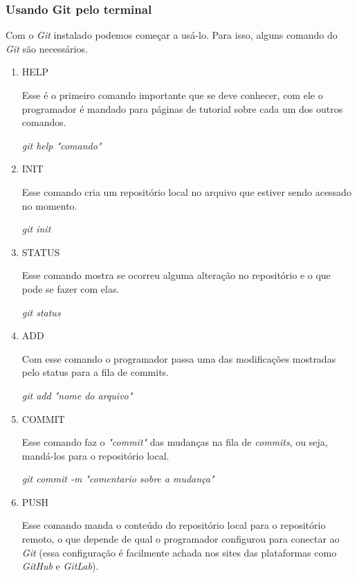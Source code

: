 \documentclass{article}
\begin{document}
\subsubsection{Usando Git pelo terminal}
\hspace{4mm}Com o \textit{Git} instalado podemos começar a usá-lo. Para isso, alguns comando do \textit{Git} são necessários.
\begin{enumerate}
    \item HELP
    
    \hspace{4mm}Esse é o primeiro comando importante que se deve conhecer, com ele o programador é mandado para páginas de tutorial sobre cada um dos outros comandos.
    
    \textit{git help "comando"}
    \item INIT
    
    \hspace{4MM}Esse comando cria um repositório local no arquivo que estiver sendo acessado no momento. 
    
    \textit{git init}
    \item STATUS
    
    \hspace{4mm}Esse comando mostra se ocorreu alguma alteração no repositório e o que pode se fazer com elas. 
    
    \textit{git status}
    \item ADD
    
    \hspace{4mm}Com esse comando o programador passa uma das modificações mostradas pelo status para a fila de commits.
    
    \textit{git add "nome do arquivo"}
    \item COMMIT
    
    \hspace{4mm}Esse comando faz o \textit{"commit"} das mudanças na fila de \textit{commits}, ou seja, mandá-los para o repositório local.
    
    \textit{git commit -m "comentario sobre a mudança"}
    \item PUSH
    
    \hspace{4mm}Esse comando manda o conteúdo do repositório local para o repositório remoto, o que depende de qual o programador configurou para conectar ao \textit{Git} (essa configuração é facilmente achada nos sites das plataformas como \textit{GitHub} e \textit{GitLab}). 
    

\end{enumerate}
\end{document}
